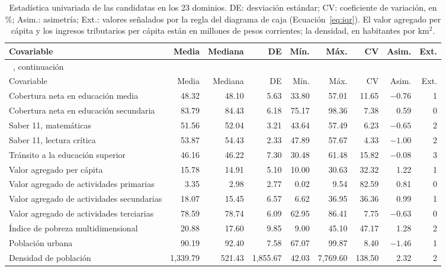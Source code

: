{\scriptsize\setlength{\tabcolsep}{2pt}
\begin{longtable}{p{2.8cm} r r r r r r r r}
\caption[Estadística univariada de las candidatas]{Estadística univariada de las candidatas en los 23 dominios. DE: desviación estándar; CV: coeficiente de variación, en \%; Asim.: asimetría; Ext.: valores señalados por la regla del diagrama de caja (Ecuación~\ref{eq:iqr}). El valor agregado per cápita y los ingresos tributarios per cápita están en millones de pesos corrientes; la densidad, en habitantes por km$^2$.}
\label{tab:app_univariado} \\
\toprule
Covariable & Media & Mediana & DE & Mín. & Máx. & CV & Asim. & Ext. \\
\midrule
\endfirsthead
\multicolumn{9}{l}{\tablename~\thetable{}, continuación} \\
\toprule
Covariable & Media & Mediana & DE & Mín. & Máx. & CV & Asim. & Ext. \\
\midrule
\endhead
\bottomrule
\endlastfoot
Cobertura neta en educación media & 48.32 & 48.10 & 5.63 & 33.80 & 57.01 & 11.65 & $-0.76$ & 1 \\
Cobertura neta en educación secundaria & 83.79 & 84.43 & 6.18 & 75.17 & 98.36 & 7.38 & 0.59 & 0 \\
Saber 11, matemáticas & 51.56 & 52.04 & 3.21 & 43.64 & 57.49 & 6.23 & $-0.65$ & 2 \\
Saber 11, lectura crítica & 53.87 & 54.43 & 2.33 & 47.89 & 57.67 & 4.33 & $-1.00$ & 2 \\
Tránsito a la educación superior & 46.16 & 46.22 & 7.30 & 30.48 & 61.48 & 15.82 & $-0.08$ & 3 \\
Valor agregado per cápita & 15.78 & 14.91 & 5.10 & 10.00 & 30.63 & 32.32 & 1.22 & 1 \\
Valor agregado de actividades primarias & 3.35 & 2.98 & 2.77 & 0.02 & 9.54 & 82.59 & 0.81 & 0 \\
Valor agregado de actividades secundarias & 18.07 & 15.45 & 6.57 & 6.62 & 36.95 & 36.36 & 0.99 & 1 \\
Valor agregado de actividades terciarias & 78.59 & 78.74 & 6.09 & 62.95 & 86.41 & 7.75 & $-0.63$ & 0 \\
Índice de pobreza multidimensional & 20.88 & 17.60 & 9.85 & 9.00 & 45.10 & 47.17 & 1.28 & 2 \\
Población urbana & 90.19 & 92.40 & 7.58 & 67.07 & 99.87 & 8.40 & $-1.46$ & 1 \\
Densidad de población & 1,339.79 & 521.43 & 1,855.67 & 42.03 & 7,769.60 & 138.50 & 2.32 & 2 \\

\end{longtable}}
